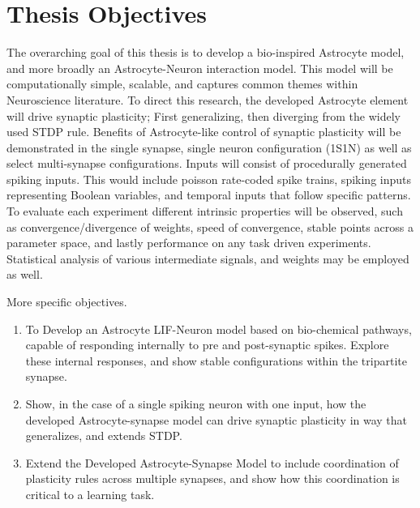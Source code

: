 \section{Thesis Objectives}

The overarching goal of this thesis is to develop a bio-inspired Astrocyte
model, and more broadly an Astrocyte-Neuron interaction model. This model will
be computationally simple, scalable, and captures common themes within
Neuroscience literature. To direct this research, the developed Astrocyte
element will drive synaptic plasticity; First generalizing, then diverging from
the widely used STDP rule. Benefits of Astrocyte-like control of synaptic
plasticity will be demonstrated in the single synapse, single neuron
configuration (1S1N) as well as select multi-synapse configurations. Inputs will
consist of procedurally generated spiking inputs. This would include poisson
rate-coded spike trains, spiking inputs representing Boolean variables, and
temporal inputs that follow specific patterns. To evaluate each experiment
different intrinsic properties will be observed, such as convergence/divergence
of weights, speed of convergence, stable points across a parameter space, and
lastly performance on any task driven experiments. Statistical analysis of
various intermediate signals, and weights may be employed as well.

More specific objectives.
\begin{enumerate}
  \item To Develop an Astrocyte LIF-Neuron model based on bio-chemical pathways,
    capable of responding internally to pre and post-synaptic spikes. Explore
    these internal responses, and show stable configurations within the
    tripartite synapse.

  \item Show, in the case of a single spiking neuron with one input, how
    the developed Astrocyte-synapse model can drive synaptic plasticity in way
    that generalizes, and extends STDP.

  \item Extend the Developed Astrocyte-Synapse Model to include coordination of
    plasticity rules across multiple synapses, and show how this coordination is
    critical to a learning task.

\end{enumerate}
